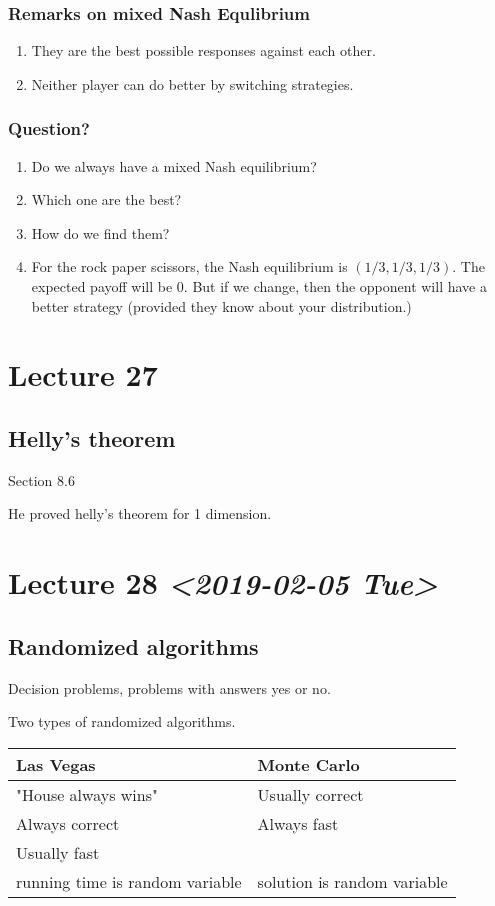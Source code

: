 \documentclass[11pt]{article}
\begin{document}
\subsubsection{Remarks on mixed Nash Equlibrium}
\label{sec:org1c346f7}
\begin{enumerate}
\item They are the best possible responses against each other.
\item Neither player can do better by switching strategies.
\end{enumerate}
\subsubsection{Question?}
\label{sec:orgb0d606d}
\begin{enumerate}
\item Do we always have a mixed Nash equilibrium?
\item Which one are the best?
\item How do we find them?
\item For the rock paper scissors, the Nash equilibrium is \((1/3, 1/3, 1/3)\).
The expected payoff will be \(0\). But if we change, then the opponent will
have a better strategy (provided they know about your distribution.)
\end{enumerate}
\section{Lecture 27}
\label{sec:org5df623c}
\subsection{Helly's theorem}
\label{sec:orgb67028f}
Section 8.6

He proved helly's theorem for 1 dimension.
\section{Lecture 28 \textit{<2019-02-05 Tue>}}
\label{sec:org763a26a}
\subsection{Randomized algorithms}
\label{sec:org3cab026}
Decision problems, problems with answers yes or no.

Two types of randomized algorithms.

\begin{center}
\begin{tabular}{ll}
Las Vegas & Monte Carlo\\
\hline
"House always wins" & Usually correct\\
Always correct & Always fast\\
Usually fast & \\
running time is random variable & solution is random variable\\
\end{tabular}
\end{center}
\end{document}
